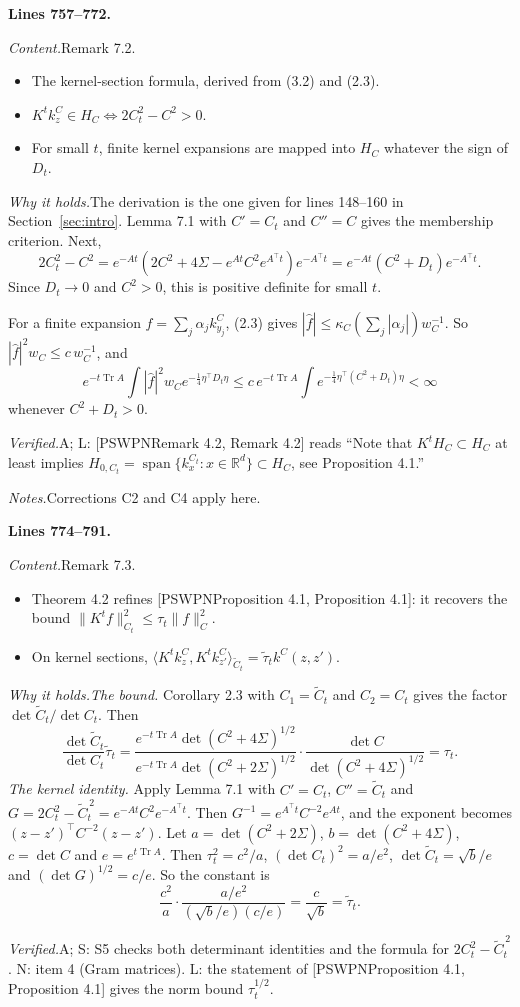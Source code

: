 \documentclass[11pt]{amsart}
\newcommand{\R}{\mathbb{R}}
\newcommand{\Tr}{\operatorname{Tr}}
\newcommand{\Ct}{\widetilde{C}_t}
\newcommand{\taut}{\widetilde{\tau}_t}
\newcommand{\ip}[2]{\langle #1,#2\rangle}
\newcommand{\hatf}[1]{\widehat{#1}}
\newcommand{\tp}{\top}
\newcommand{\src}[1]{\par\bigskip\noindent\textbf{Lines #1.}\enspace}
\newcommand{\content}{\par\smallskip\noindent\textit{Content.}\enspace}
\newcommand{\why}{\par\smallskip\noindent\textit{Why it holds.}\enspace}
\newcommand{\verified}{\par\smallskip\noindent\textit{Verified.}\enspace}
\newcommand{\notes}{\par\smallskip\noindent\textit{Notes.}\enspace}
\newcommand{\tA}{\textsf{A}}
\newcommand{\tS}{\textsf{S}}
\newcommand{\tN}{\textsf{N}}
\newcommand{\tL}{\textsf{L}}
\newcommand{\PS}[1][]{[PSWPN\ifx\relax#1\relax\else, #1\fi]}
\begin{document}
\src{757--772}
\content Remark 7.2.
\begin{itemize}
\item The kernel-section formula, derived from (3.2) and (2.3).
\item $K^tk^C_z\in H_C\iff2C_t^2-C^2>0$.
\item For small $t$, finite kernel expansions are mapped into $H_C$ whatever the sign of $D_t$.
\end{itemize}
\why The derivation is the one given for lines 148--160 in Section~\ref{sec:intro}. Lemma 7.1 with $C'=C_t$ and
$C''=C$ gives the membership criterion. Next,
\[
2C_t^2-C^2=e^{-At}(2C^2+4\Sigma-e^{At}C^2e^{A^\tp t})e^{-A^\tp t}=e^{-At}(C^2+D_t)e^{-A^\tp t}.
\]
Since $D_t\to0$ and $C^2>0$, this is positive definite for small $t$.

For a finite expansion $f=\sum_j\alpha_jk^C_{y_j}$, (2.3) gives $|\hatf f|\le\kappa_C(\sum_j|\alpha_j|)w_C^{-1}$. So
$|\hatf f|^2w_C\le c\,w_C^{-1}$, and
\[
e^{-t\Tr A}\int|\hatf f|^2w_Ce^{-\frac14\eta^\tp D_t\eta}\le c\,e^{-t\Tr A}\int e^{-\frac14\eta^\tp(C^2+D_t)\eta}<\infty
\]
whenever $C^2+D_t>0$.
\verified \tA; \tL: \PS[Remark 4.2] reads ``Note that $K^tH_C\subset H_C$ at least implies
$H_{0,C_t}=\operatorname{span}\{k^{C_t}_x:x\in\R^d\}\subset H_C$, see Proposition 4.1.''
\notes Corrections C2 and C4 apply here.

\src{774--791}
\content Remark 7.3.
\begin{itemize}
\item Theorem 4.2 refines \PS[Proposition 4.1]: it recovers the bound $\|K^tf\|_{C_t}^2\le\tau_t\|f\|_C^2$.
\item On kernel sections, $\ip{K^tk^C_z}{K^tk^C_{z'}}_{\Ct}=\taut k^C(z,z')$.
\end{itemize}
\why \emph{The bound.} Corollary 2.3 with $C_1=\Ct$ and $C_2=C_t$ gives the factor $\det\Ct/\det C_t$. Then
\[
\frac{\det\Ct}{\det C_t}\taut=\frac{e^{-t\Tr A}\det(C^2+4\Sigma)^{1/2}}{e^{-t\Tr A}\det(C^2+2\Sigma)^{1/2}}\cdot
\frac{\det C}{\det(C^2+4\Sigma)^{1/2}}=\tau_t .
\]
\emph{The kernel identity.} Apply Lemma 7.1 with $C'=C_t$, $C''=\Ct$ and $G=2C_t^2-\Ct^{\,2}=e^{-At}C^2e^{-A^\tp t}$.
Then $G^{-1}=e^{A^\tp t}C^{-2}e^{At}$, and the exponent becomes $(z-z')^\tp C^{-2}(z-z')$. Let
$a=\det(C^2+2\Sigma)$, $b=\det(C^2+4\Sigma)$, $c=\det C$ and $e=e^{t\Tr A}$. Then $\tau_t^2=c^2/a$,
$(\det C_t)^2=a/e^2$, $\det\Ct=\sqrt b/e$ and $(\det G)^{1/2}=c/e$. So the constant is
\[
\frac{c^2}{a}\cdot\frac{a/e^2}{(\sqrt b/e)(c/e)}=\frac c{\sqrt b}=\taut .
\]
\verified \tA; \tS: S5 checks both determinant identities and the formula for $2C_t^2-\Ct^{\,2}$. \tN: item 4
(Gram matrices). \tL: the statement of \PS[Proposition 4.1] gives the norm bound $\tau_t^{1/2}$.
\end{document}
